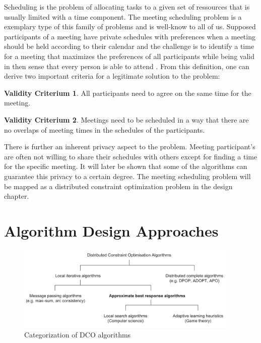 Scheduling is the problem of allocating tasks to a given set of ressources that is usually limited with a time component. The meeting scheduling problem is a exemplary type of this family of problems and is well-know to all of us. Supposed participants of a meeting have private schedules with preferences when a meeting should be held according to their calendar and the challenge is to identify a time for a meeting that maximizes the preferences of all participants while being valid in then sense that every person is able to attend \cite{Farinelli}. From this definition, one can derive two important criteria for a legitimate solution to the problem:
\theoremstyle{definition}
\newtheorem{hardconstraint1}{Validity Criterium}
\begin{hardconstraint1}
All participants need to agree on the same time for the meeting.
\end{hardconstraint1}
\begin{hardconstraint1}
Meetings need to be scheduled in a way that there are no overlaps of meeting times in the schedules of the participants.
\end{hardconstraint1}
    
There is further an inherent privacy aspect to the problem. Meeting participant's are often not willing to share their schedules with others except for finding a time for the specific meeting. It will later be shown that some of the algorithms can guarantee this privacy to a certain degree. The meeting scheduling problem will be mapped as a distributed constraint optimization problem in the design chapter.
    
   
    

\section{Algorithm Design Approaches}

\begin{figure}[h]
\includegraphics[width=400px]{graphics/overview_algos}
\caption{Categorization of DCO algorithms \cite{Chapman2011}}
\end{figure}


